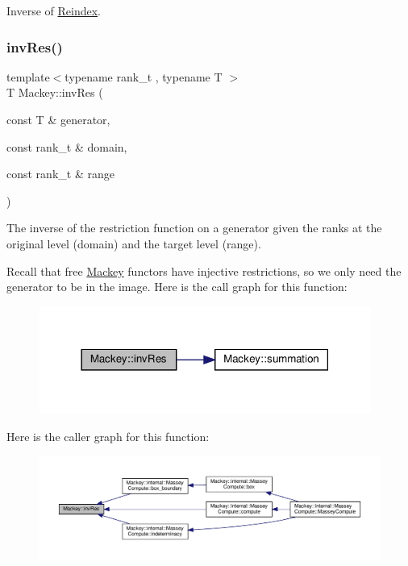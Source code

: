 Inverse of \hyperlink{namespaceMackey_a7da73ade3ee83c4ffd614e79242d7c04}{Reindex}. 

\mbox{\label{namespaceMackey_a8e17fb4ada60b950c8f4efe273b23783}} 
\subsubsection{\texorpdfstring{inv\+Res()}{invRes()}}
{\footnotesize\ttfamily template$<$typename rank\+\_\+t , typename T $>$ \\
T Mackey\+::inv\+Res (\begin{DoxyParamCaption}\item[{const T \&}]{generator,  }\item[{const rank\+\_\+t \&}]{domain,  }\item[{const rank\+\_\+t \&}]{range }\end{DoxyParamCaption})}

The inverse of the restriction function on a generator given the ranks at the original level (domain) and the target level (range).

Recall that free \hyperlink{namespaceMackey}{Mackey} functors have injective restrictions, so we only need the generator to be in the image. Here is the call graph for this function\+:\nopagebreak
\begin{figure}[H]
\begin{center}
\leavevmode
\includegraphics[width=309pt]{namespaceMackey_a8e17fb4ada60b950c8f4efe273b23783_cgraph}
\end{center}
\end{figure}
Here is the caller graph for this function\+:\nopagebreak
\begin{figure}[H]
\begin{center}
\leavevmode
\includegraphics[width=350pt]{namespaceMackey_a8e17fb4ada60b950c8f4efe273b23783_icgraph}
\end{center}
\end{figure}
\mbox{\label{namespaceMackey_a2b6ac22efe0be546f2c3f8abc2ceb5b7}} 
